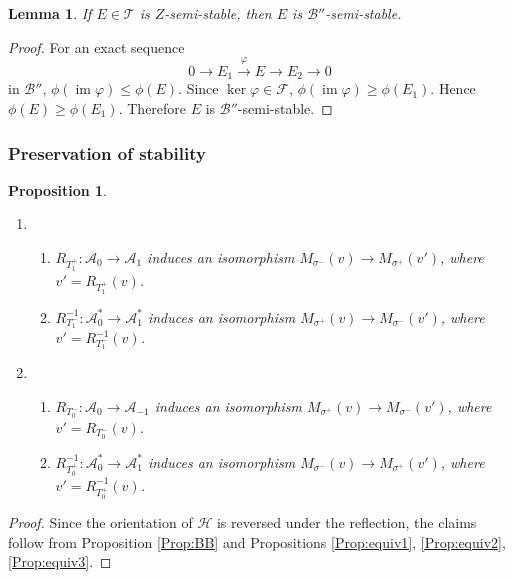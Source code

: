 \documentclass[leqno,11pt]{amsart}
\def\im{\mathop{\mathrm{im}}\nolimits}
\newtheorem{Prop}[Thm]{Proposition}
\newtheorem{Lem}[Thm]{Lemma}
\theoremstyle{definition}
\def\AA{\ensuremath{\mathcal A}}
\def\BB{\ensuremath{\mathcal B}}
\def\FF{\ensuremath{\mathcal F}}
\def\HH{\ensuremath{\mathcal H}}
\def\TT{\ensuremath{\mathcal T}}
\begin{document}
\begin{Lem}
If $E \in \TT$ is $Z$-semi-stable, then
$E$ is $\BB''$-semi-stable.
\end{Lem}

\begin{proof}
For an exact sequence
\begin{equation}
0 \to E_1 \overset{\varphi}{\to} E \to E_2 \to 0
\end{equation}
in $\BB''$,
$\phi(\im \varphi) \leq \phi(E)$.
Since $\ker \varphi \in \FF$,
$\phi(\im \varphi) \geq \phi(E_1)$.
Hence $\phi(E) \geq \phi(E_1)$.
Therefore $E$ is $\BB''$-semi-stable.
\end{proof} 


\subsubsection{Preservation of stability}

\begin{Prop}\label{Prop:isom-pm}
\begin{enumerate}
\item[(1)]
\begin{enumerate}
\item
$R_{T_1^+}:\AA_0 \to \AA_1$ induces an isomorphism
$M_{\sigma^-}(v) \to M_{\sigma^+}(v')$, where  $v'=R_{T_1^+}(v)$.
\item
$R_{T_1^-}^{-1}:\AA_0^* \to \AA_1^*$ induces an isomorphism
$M_{\sigma^+}(v) \to M_{\sigma^-}(v')$, where  $v'=R_{T_1^-}^{-1}(v)$.
\end{enumerate}
\item[(2)]
\begin{enumerate}
\item
$R_{T_0^-}:\AA_0 \to \AA_{-1}$ induces an isomorphism
$M_{\sigma^+}(v) \to M_{\sigma^-}(v')$, where  $v'=R_{T_0^-}(v)$.
\item
$R_{T_0^+}^{-1}:\AA_0^* \to \AA_1^*$ induces an isomorphism
$M_{\sigma^-}(v) \to M_{\sigma^+}(v')$, where  $v'=R_{T_0^+}^{-1}(v)$.
\end{enumerate}
\end{enumerate}
\end{Prop}

\begin{proof}
Since the orientation of $\HH$ is reversed under the reflection,
the claims follow from Proposition \ref{Prop:BB} and Propositions \ref{Prop:equiv1},
\ref{Prop:equiv2}, \ref{Prop:equiv3}.
\end{proof}
\end{document}
